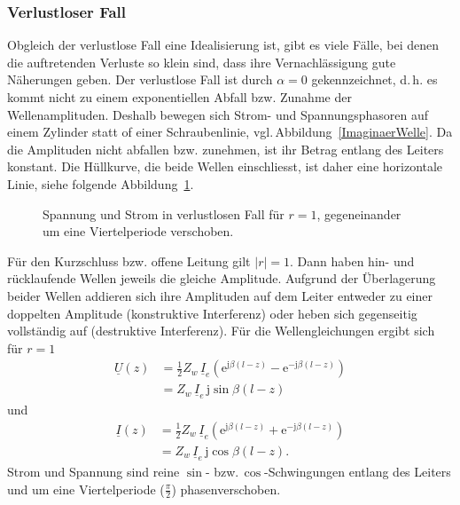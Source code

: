 \documentclass[paper=a4, parskip=half-, ngerman, fontsize=11pt]{scrreprt}
\begin{document}
\subsubsection{Verlustloser Fall}
Obgleich der verlustlose Fall eine Idealisierung ist, gibt es viele Fälle, bei denen die auftretenden Verluste so klein
sind, dass ihre Vernachlässigung gute Näherungen geben. Der verlustlose Fall ist durch $\alpha = 0$ gekennzeichnet,
d.\,h. es kommt nicht zu einem exponentiellen Abfall bzw. Zunahme der Wellenamplituden. Deshalb bewegen sich Strom- und
Spannungsphasoren auf einem Zylinder statt of einer Schraubenlinie, vgl.\,Abbildung~\ref{ImaginaerWelle}. Da die
Amplituden nicht abfallen bzw. zunehmen, ist ihr Betrag entlang des Leiters konstant. Die Hüllkurve, die beide Wellen
einschliesst, ist daher eine horizontale Linie, siehe folgende Abbildung~\ref{VerlustlosBetrag}.
\begin{figure}[!htb]
    \begin{center}
        
        \caption{Spannung und Strom in verlustlosen Fall für $r = 1$, gegeneinander um eine Viertelperiode verschoben.}
        \label{VerlustlosBetrag}
    \end{center}
\end{figure}
Für den Kurzschluss bzw. offene Leitung gilt $|r|=1$. Dann haben hin- und rücklaufende Wellen jeweils die gleiche
Amplitude. Aufgrund der Überlagerung beider Wellen addieren sich ihre Amplituden auf dem Leiter entweder zu einer
doppelten Amplitude (konstruktive Interferenz) oder heben sich gegenseitig vollständig auf (destruktive Interferenz).
Für die Wellengleichungen ergibt sich für $r = 1$
\begin{align*}
\underline{U}(z) &= \frac{1}{2} Z_{w} \, \underline{I}_{e}
\left( \mathrm{e}^{\mathrm{j} \beta (l - z)} - \mathrm{e}^{- \mathrm{j} \beta (l - z)} \right) \\[1ex]
&= Z_{w} \, \underline{I}_{e} \, \mathrm{j} \sin \beta (l - z)
\end{align*}
und
\begin{align*}
    \underline{I}(z) &= \frac{1}{2} Z_{w} \, \underline{I}_{e}
    \left( \mathrm{e}^{\mathrm{j} \beta (l - z)} + \mathrm{e}^{- \mathrm{j} \beta (l - z)} \right) \\[1ex]
    &= Z_{w} \, \underline{I}_{e} \, \mathrm{j} \cos \beta (l - z).
\end{align*}
Strom und Spannung sind reine $\sin$- bzw.\,$\cos$-Schwingungen entlang des Leiters und um eine Viertelperiode
($\frac{\pi}{2}$) phasenverschoben.
\end{document}
